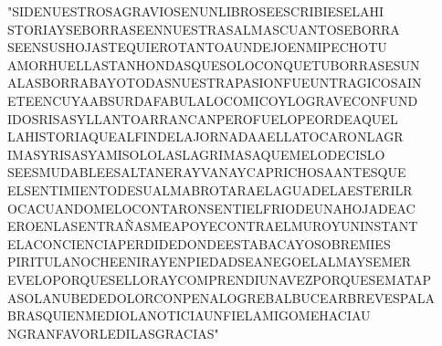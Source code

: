\documentclass[12pt, letterpaper]{article}
\begin{document}
"SIDENUESTROSAGRAVIOSENUNLIBROSEESCRIBIESELAHI\\
STORIAYSEBORRASEENNUESTRASALMASCUANTOSEBORRA\\
SEENSUSHOJASTEQUIEROTANTOAUNDEJOENMIPECHOTU\\
AMORHUELLASTANHONDASQUESOLOCONQUETUBORRASESUN\\
ALASBORRABAYOTODASNUESTRAPASIONFUEUNTRAGICOSAIN\\
ETEENCUYAABSURDAFABULALOCOMICOYLOGRAVECONFUND\\
IDOSRISASYLLANTOARRANCANPEROFUELOPEORDEAQUEL\\
LAHISTORIAQUEALFINDELAJORNADAAELLATOCARONLAGR\\
IMASYRISASYAMISOLOLASLAGRIMASAQUEMELODECISLO\\
SEESMUDABLEESALTANERAYVANAYCAPRICHOSAANTESQUE\\
ELSENTIMIENTODESUALMABROTARAELAGUADELAESTERILR\\
OCACUANDOMELOCONTARONSENTIELFRIODEUNAHOJADEAC\\
EROENLASENTRAÑASMEAPOYECONTRAELMUROYUNINSTANT\\
ELACONCIENCIAPERDIDEDONDEESTABACAYOSOBREMIES\\
PIRITULANOCHEENIRAYENPIEDADSEANEGOELALMAYSEMER\\
EVELOPORQUESELLORAYCOMPRENDIUNAVEZPORQUESEMATAP\\
ASOLANUBEDEDOLORCONPENALOGREBALBUCEARBREVESPALA\\
BRASQUIENMEDIOLANOTICIAUNFIELAMIGOMEHACIAU\\
NGRANFAVORLEDILASGRACIAS"\\
 
\end{document}
